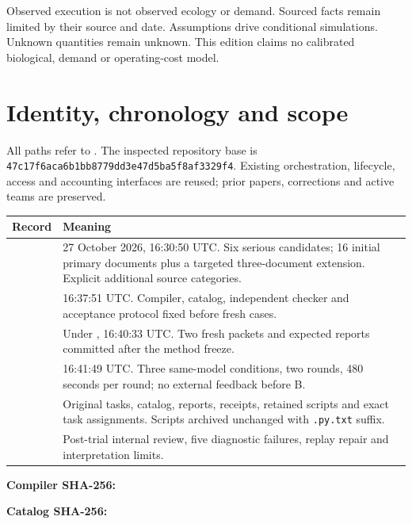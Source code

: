 \documentclass[10pt]{article}
\begin{document}
\begin{finding}[title=How to read the evidence]
Observed execution is not observed ecology or demand. Sourced facts remain limited by their source and date. Assumptions drive conditional simulations. Unknown quantities remain unknown. This edition claims no calibrated biological, demand or operating-cost model.
\end{finding}

\section{Identity, chronology and scope}
All paths refer to . The inspected repository base is \texttt{47c17f6aca6b1bb8779dd3e47d5ba5f8af3329f4}. Existing orchestration, lifecycle, access and accounting interfaces are reused; prior papers, corrections and active teams are preserved.

\begin{tabularx}{\textwidth}{@{}p{35mm}Y@{}}
\toprule
Record & Meaning\\\midrule
{} & 27 October 2026, 16:30:50 UTC. Six serious candidates; 16 initial primary documents plus a targeted three-document extension. Explicit additional source categories.\\
 & 16:37:51 UTC. Compiler, catalog, independent checker and acceptance protocol fixed before fresh cases.\\
 & Under , 16:40:33 UTC. Two fresh packets and expected reports committed after the method freeze.\\
 & 16:41:49 UTC. Three same-model conditions, two rounds, 480 seconds per round; no external feedback before B.\\
 & Original tasks, catalog, reports, receipts, retained scripts and exact task assignments. Scripts archived unchanged with \texttt{.py.txt} suffix.\\
 & Post-trial internal review, five diagnostic failures, replay repair and interpretation limits.\\
\bottomrule
\end{tabularx}

\textbf{Compiler SHA-256:}\par
{}\par
\textbf{Catalog SHA-256:}\par
{}
\end{document}
